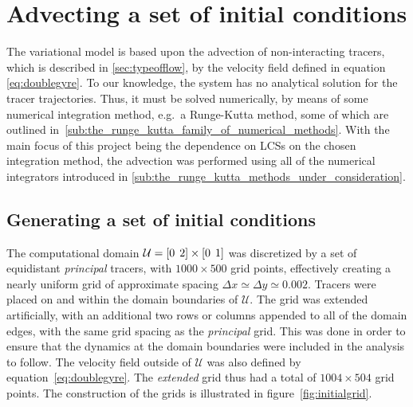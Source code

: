 \section{Advecting a set of initial conditions}
\label{sec:advecting_a_set_of_initial_conditions}

The variational model is based upon the advection of non-interacting tracers,
which is described in \cref{sec:typeofflow}, by the velocity field defined in
equation \eqref{eq:doublegyre}. To our knowledge, the system has no analytical
solution for the tracer trajectories. Thus, it must be solved numerically, by
means of some numerical integration method, e.g.\ a Runge-Kutta method, some of
which are outlined in~\cref{sub:the_runge_kutta_family_of_numerical_methods}.
With the main focus of this project being the dependence on LCSs on the chosen
integration method, the advection was performed using all of the numerical
integrators introduced in
\cref{sub:the_runge_kutta_methods_under_consideration}.

\subsection{Generating a set of initial conditions}
\label{sub:generating_a_set_of_initial_conditions}
The computational domain $\mathcal{U}=[0\hspace{1ex}2]\times[0\hspace{1ex}1]$
was discretized by a set of equidistant \emph{principal} tracers, with
$1000\times500$  grid points, effectively creating a nearly uniform grid of
approximate spacing $\Delta{x}\simeq\Delta{y}\simeq0.002$. Tracers were placed
on and within the domain boundaries of $\mathcal{U}$. The grid was extended
artificially, with an additional two rows or columns appended to all of the
domain edges, with the same grid spacing as the \emph{principal} grid. This was
done in order  to ensure that the dynamics at the domain boundaries were
included in the analysis to follow. The velocity field outside of
$\mathcal{U}$ was also defined by equation~\eqref{eq:doublegyre}. The
\emph{extended} grid thus had a total of $1004\times504$ grid points.
The construction of the grids is illustrated in figure~\ref{fig:initialgrid}.
\clearpage


